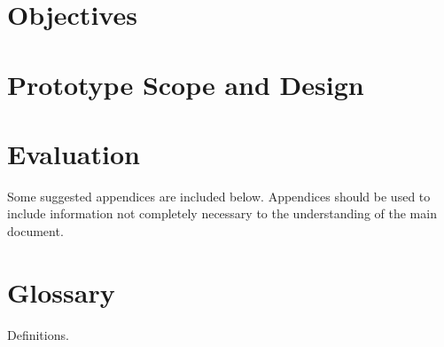 \documentclass{l3deliverable}
\begin{document}

\section{Objectives}


\section{Prototype Scope and Design}


\section{Evaluation}


\appendix

Some suggested appendices are included below. Appendices should be
used to include information not completely necessary to the
understanding of the main document.


\section{Glossary}

Definitions.

\end{document}

